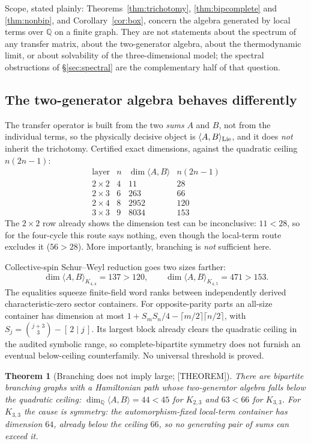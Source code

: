 \documentclass[11pt]{article}
\newtheorem{theorem}{Theorem}[section]
\theoremstyle{definition}
\newcommand{\Qb}{\mathbb{Q}}
\begin{document}
Scope, stated plainly: Theorems~\ref{thm:trichotomy}, \ref{thm:bipcomplete} and
\ref{thm:nonbip}, and Corollary~\ref{cor:box}, concern the algebra generated by local terms over
$\Qb$ on a finite graph. They are not statements about the spectrum of any transfer matrix, about the two-generator
algebra, about the thermodynamic limit, or about solvability of the three-dimensional model; the
spectral obstructions of \S\ref{sec:spectral} are the complementary half of that question.

\subsection{The two-generator algebra behaves differently}\label{sec:twogen}
The transfer operator is built from the two \emph{sums} $A$ and $B$, not from the individual terms,
so the physically decisive object is $\langle A,B\rangle_{\rm Lie}$, and it does \emph{not} inherit
the trichotomy. Certified exact dimensions, against the quadratic ceiling $n(2n-1)$:
\[
\begin{array}{l|c|r|r}
\text{layer} & n & \dim\langle A,B\rangle & n(2n-1)\\ \hline
2\times2 & 4 & 11 & 28\\
2\times3 & 6 & 263 & 66\\
2\times4 & 8 & 2952 & 120\\
3\times3 & 9 & 8034 & 153
\end{array}
\]
The $2\times2$ row already shows the dimension test can be inconclusive: $11<28$, so for the
four-cycle this route says nothing, even though the local-term route excludes it
($56>28$). More importantly, branching is \emph{not} sufficient here.


Collective-spin Schur--Weyl reduction goes two sizes farther:
\[
\dim\langle A,B\rangle_{K_{4,4}}=137>120,\qquad
\dim\langle A,B\rangle_{K_{4,5}}=471>153.
\]
The equalities squeeze finite-field word ranks between independently derived characteristic-zero
sector containers. For opposite-parity parts an all-size container has dimension at most
$1+S_mS_n/4-\lceil m/2\rceil\lceil n/2\rceil$, with
$S_j=\binom{j+3}{3}-[\,2\mid j\,]$. Its largest block already clears the quadratic ceiling in the
audited symbolic range, so complete-bipartite symmetry does not furnish an eventual below-ceiling
counterfamily. No universal threshold is proved.
\begin{theorem}[Branching does not imply large; {[THEOREM]}]\label{thm:kcounter}
There are bipartite branching graphs with a Hamiltonian path whose two-generator algebra falls below
the quadratic ceiling: $\dim_\Qb\langle A,B\rangle=44<45$ for $K_{2,3}$ and $63<66$ for $K_{3,3}$.
For $K_{3,3}$ the cause is symmetry: the automorphism-fixed local-term container has dimension $64$,
already below the ceiling $66$, so no generating pair of sums can exceed it.
\end{theorem}
\end{document}
